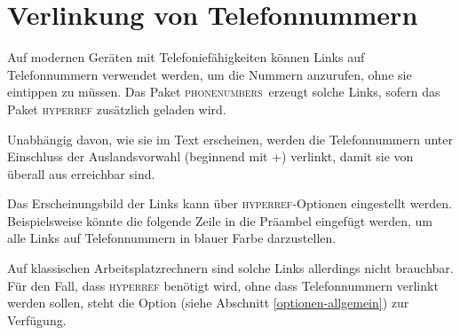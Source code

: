 \documentclass[numbers=noenddot]{scrreprt}
\newcommand*\Paket[1]{\textsc{#1}}
\newcommand\phone{\textcolor{cnltx}{\Paket{phone\-numbers}}}
\newcommand*\sieheAbschnitt[1]{(siehe Abschnitt \ref{#1})}
\begin{document}
\section{Verlinkung von Telefonnummern} \label{verlinkung}
Auf modernen Geräten mit Telefoniefähigkeiten können Links auf Telefonnummern verwendet werden, um die Nummern anzurufen, ohne sie eintippen zu müssen. Das Paket \phone\ erzeugt solche Links, sofern das Paket \Paket{hyperref}
\cite{hyperref}
zusätzlich geladen wird.

Unabhängig davon, wie sie im Text erscheinen, werden die Telefonnummern unter Einschluss der Auslandsvorwahl (beginnend mit +) verlinkt, damit sie von überall aus erreichbar sind.

Das Erscheinungsbild der Links kann über \Paket{hyperref}-Optionen eingestellt werden. Beispielsweise könnte die folgende Zeile in die Präambel eingefügt werden, um alle Links auf Telefonnummern in blauer Farbe darzustellen.

\begin{sourcecode}
  \usepackage[colorlinks=true,urlcolor=blue]{hyperref}
\end{sourcecode}

Auf klassischen Arbeitsplatzrechnern sind solche Links allerdings nicht brauchbar. Für den Fall, dass \Paket{hyperref} benötigt wird, ohne dass Telefonnummern verlinkt werden sollen, steht die Option 
\sieheAbschnitt{optionen-allgemein} zur Verfügung.
\end{document}
